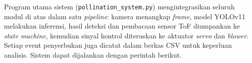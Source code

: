 

Program utama sistem (\texttt{pollination\_system.py}) mengintegrasikan seluruh modul di atas dalam satu \emph{pipeline}: kamera menangkap \emph{frame}, model YOLOv11 melakukan inferensi, hasil deteksi dan pembacaan sensor ToF diumpankan ke \emph{state machine}, kemudian sinyal kontrol diteruskan ke aktuator \emph{servo} dan \emph{blower}. Setiap event penyerbukan juga dicatat dalam berkas CSV untuk keperluan analisis. Sistem dapat dijalankan dengan perintah berikut.



